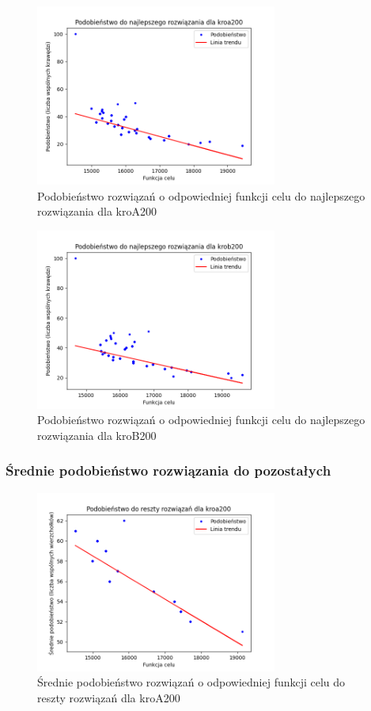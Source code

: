 \documentclass[a4paper]{article}
\begin{document}
\begin{figure}[H]
\centering
\includegraphics[width=300px]{lab6/bca.png}
\caption{Podobieństwo rozwiązań o odpowiedniej funkcji celu do najlepszego rozwiązania dla kroA200}
\end{figure}

\begin{figure}[H]
\centering
\includegraphics[width=300px]{lab6/bcb.png}
\caption{Podobieństwo rozwiązań o odpowiedniej funkcji celu do najlepszego rozwiązania dla kroB200}
\end{figure}

\subsubsection{Średnie podobieństwo rozwiązania do pozostałych}

\begin{figure}[H]
\centering
\includegraphics[width=300px]{lab6/apa.png}
\caption{Średnie podobieństwo rozwiązań o odpowiedniej funkcji celu do reszty rozwiązań dla kroA200}
\end{figure}
\end{document}
